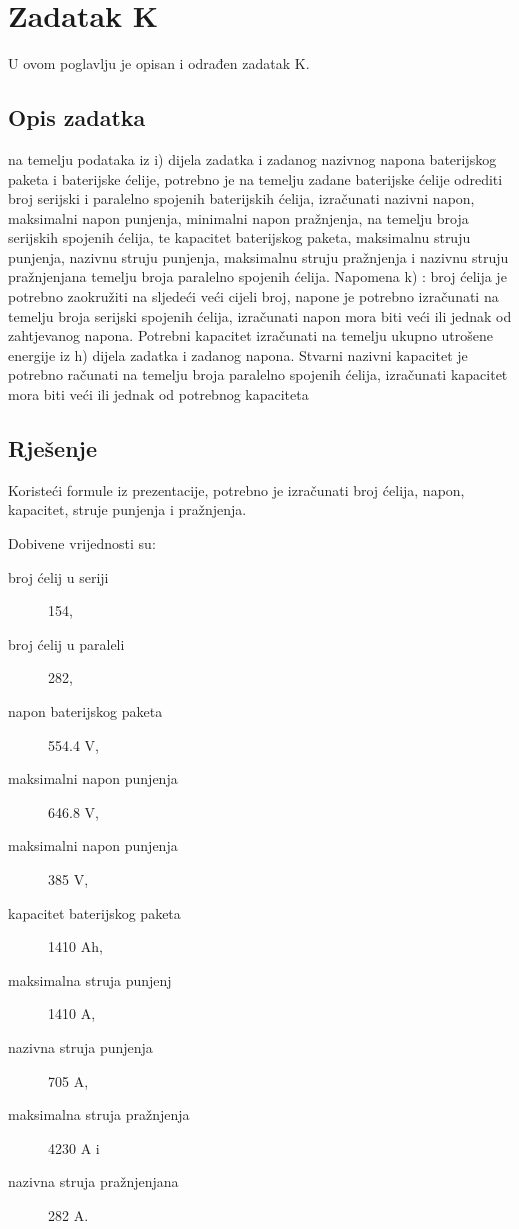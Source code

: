 \chapter{Zadatak K} \label{ch:k}

U ovom poglavlju je opisan i odrađen zadatak K.

\section{Opis zadatka} \label{sec:k:opis}

na temelju podataka iz i) dijela zadatka i zadanog nazivnog napona baterijskog paketa i baterijske
ćelije, potrebno je na temelju zadane baterijske ćelije odrediti broj serijski i paralelno spojenih
baterijskih ćelija, izračunati nazivni napon, maksimalni napon punjenja, minimalni napon pražnjenja,
na temelju broja serijskih spojenih ćelija, te kapacitet baterijskog paketa, maksimalnu struju
punjenja, nazivnu struju punjenja, maksimalnu struju pražnjenja i nazivnu struju pražnjenjana
temelju broja paralelno spojenih ćelija.
Napomena k) : broj ćelija je potrebno zaokružiti na sljedeći veći cijeli broj, napone je potrebno
izračunati na temelju broja serijski spojenih ćelija, izračunati napon mora biti veći ili jednak od
zahtjevanog napona. Potrebni kapacitet izračunati na temelju ukupno utrošene energije iz h) dijela
zadatka i zadanog napona. Stvarni nazivni kapacitet je potrebno računati na temelju broja
paralelno spojenih ćelija, izračunati kapacitet mora biti veći ili jednak od potrebnog kapaciteta

\section{Rješenje} \label{sec:k:rjesenje}

Koristeći formule iz prezentacije, potrebno je izračunati broj ćelija, napon, kapacitet, struje punjenja i pražnjenja.

Dobivene vrijednosti su:
\begin{description}
    \item[broj ćelij u seriji] 154,
    \item[broj ćelij u paraleli] 282,
    \item[napon baterijskog paketa] 554.4 V,
    \item[maksimalni napon punjenja] 646.8 V,
    \item[maksimalni napon punjenja] 385 V,
    \item[kapacitet baterijskog paketa] 1410 Ah,
    \item[maksimalna struja punjenj] 1410 A,
    \item[nazivna struja punjenja] 705 A,
    \item[maksimalna struja pražnjenja] 4230 A i
    \item[nazivna struja pražnjenjana] 282 A.
\end{description}